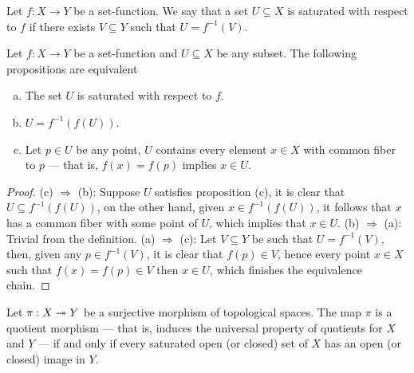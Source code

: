 \begin{definition}
\label{def:saturated-fiber}
Let \(f: X \to Y\) be a set-function. We say that a set \(U \subseteq X\) is
saturated with respect to \(f\) if there exists \(V \subseteq Y\) such that
\(U = f^{-1}(V)\).
\end{definition}

\begin{proposition}
\label{prop:equivalences-saturated-fiber}
Let \(f: X \to Y\) be a set-function and \(U \subseteq X\) be any subset. The
following propositions are equivalent
\begin{enumerate}[(a)]\setlength\itemsep{0em}
\item The set \(U\) is saturated with respect to \(f\).
\item \(U = f^{-1}(f(U))\).
\item Let \(p \in U\) be any point, \(U\) contains every element \(x \in X\)
  with common fiber to \(p\) --- that is, \(f(x) = f(p)\) implies \(x \in U\).
\end{enumerate}
\end{proposition}

\begin{proof}
(c) \(\Rightarrow\) (b): Suppose \(U\) satisfies proposition (c), it is clear
that \(U \subseteq f^{-1}(f(U))\), on the other hand, given \(x \in
f^{-1}(f(U))\), it follows that \(x\) has a common fiber with some point of
\(U\), which implies that \(x \in U\). (b) \(\Rightarrow\) (a): Trivial from the
definition. (a) \(\Rightarrow\) (c): Let \(V \subseteq Y\) be such that \(U =
f^{-1}(V)\), then, given any \(p \in f^{-1}(V)\), it is clear that \(f(p) \in
V\), hence every point \(x \in X\) such that \(f(x) = f(p) \in V\) then \(x \in
U\), which finishes the equivalence chain.
\end{proof}

\begin{proposition}
\label{prop:surjective-saturated-is-quotient}
Let \(\pi: X \twoheadrightarrow Y\) be a surjective morphism of topological spaces. The map
\(\pi\) is a quotient morphism --- that is, induces the universal property of
quotients for \(X\) and \(Y\) --- if and only if every saturated open (or
closed) set of \(X\) has an open (or closed) image in \(Y\).
\end{proposition}

